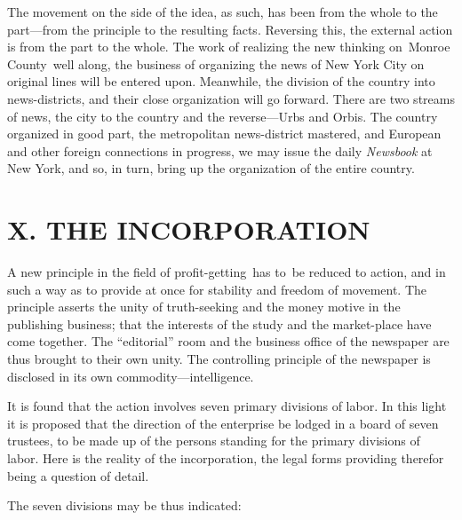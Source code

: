 \documentclass[twoside,symmetric,nobib,justified]{tufte-book}
\begin{document}
The movement on the side of the idea, as such, has been from the whole
to the part---from the principle to the resulting facts. Reversing this,
the external action is from the part to the whole. The work of realizing
the new thinking on~Monroe County~well along, the business of organizing
the news of New York City on original lines will be entered upon.
Meanwhile, the division of the country into news-districts, and their
close organization will go forward. There are two streams of news, the
city to the country and the reverse---Urbs and Orbis. The country
organized in good part, the metropolitan news-district mastered, and
European and other foreign connections in progress, we may issue the
daily \emph{Newsbook} at New York, and so, in turn, bring up the
organization of the entire country.~

\hypertarget{x-the-incorporation}{%
\section{X. THE INCORPORATION}\label{x-the-incorporation}}

A new principle in the field of profit-getting~has to~be reduced to
action, and in such a way as to provide at once for stability and
freedom of movement. The principle asserts the unity of truth-seeking
and the money motive in the publishing business; that the interests of
the study and the market-place have come together. The ``editorial''
room and the business office of the newspaper are thus brought to their
own unity. The controlling principle of the newspaper is disclosed in
its own commodity---intelligence.~~

It is found that the action involves seven primary divisions of labor.
In this light it is proposed that the direction of the enterprise be
lodged in a board of seven trustees, to be made up of the persons
standing for the primary divisions of labor. Here is the reality of the
incorporation, the legal forms providing therefor being a question of
detail.~

The seven divisions may be thus indicated:~
\end{document}
